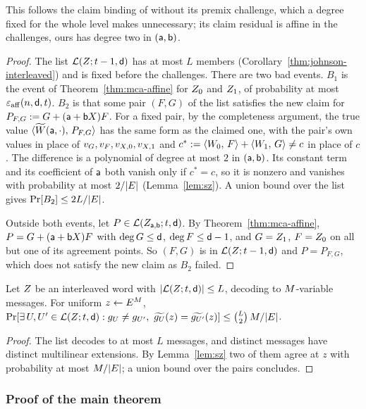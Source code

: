 This follows the claim binding of \cite[Thm.~5.1]{CWYZ26} without its premix challenge, which a degree fixed for the whole level makes unnecessary; its claim residual is affine in the challenges, ours has degree two in $(\mathsf{a},\mathsf{b})$.

\begin{proof}
The list $\mathcal{L}(Z;t-1,\mathsf{d})$ has at most $L$ members (Corollary~\ref{thm:johnson-interleaved}) and is fixed before the challenges. There are two bad events. $B_1$ is the event of Theorem~\ref{thm:mca-affine} for $Z_0$ and $Z_1$, of probability at most $\varepsilon_{\mathrm{aff}}(n,\mathsf{d},t)$. $B_2$ is that some pair $(F,G)$ of the list satisfies the new claim for $P_{F,G}:=G+(\mathsf{a}+\mathsf{b} X)F$. For a fixed pair, by the completeness argument, the true value $\langle \widetilde{W}(\mathsf{a},\cdot),\, P_{F,G} \rangle$ has the same form as the claimed one, with the pair's own values in place of $v_G,v_F,v_{X,0},v_{X,1}$ and $c^\ast:=\langle W_0,\, F \rangle+\langle W_1,\, G \rangle\neq c$ in place of $c$. The difference is a polynomial of degree at most $2$ in $(\mathsf{a},\mathsf{b})$. Its constant term and its coefficient of $\mathsf{a}$ both vanish only if $c^\ast=c$, so it is nonzero and vanishes with probability at most $2/|E|$ (Lemma~\ref{lem:sz}). A union bound over the list gives $\Pr[B_2]\le2L/|E|$.

Outside both events, let $P\in\mathcal{L}(Z_{\mathsf{a},\mathsf{b}};t,\mathsf{d})$. By Theorem~\ref{thm:mca-affine}, $P=G+(\mathsf{a}+\mathsf{b} X)F$ with $\deg G\le\mathsf{d}$, $\deg F\le\mathsf{d}-1$, and $G=Z_1$, $F=Z_0$ on all but one of its agreement points. So $(F,G)$ is in $\mathcal{L}(Z;t-1,\mathsf{d})$ and $P=P_{F,G}$, which does not satisfy the new claim as $B_2$ failed.
\end{proof}

\begin{lemma}\label{lem:ood}
Let $Z$ be an interleaved word with $|\mathcal{L}(Z;t,\mathsf{d})| \le L$, decoding to $M$-variable messages. For uniform $z \leftarrow E^{M}$, $\Pr[\exists\, U, U' \in \mathcal{L}(Z;t,\mathsf{d}) : g_U\neq g_{U'},\ \widetilde{g_U}(z) = \widetilde{g_{U'}}(z)] \le \binom{L}{2}\, M / |E|$.
\end{lemma}

\begin{proof}
The list decodes to at most $L$ messages, and distinct messages have distinct multilinear extensions. By Lemma~\ref{lem:sz} two of them agree at $z$ with probability at most $M/|E|$; a union bound over the pairs concludes.
\end{proof}

\subsubsection{Proof of the main theorem}\label{pcs:proof}

